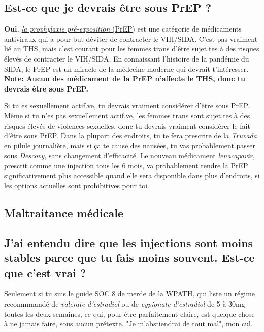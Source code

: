 \documentclass{article}
\begin{document}
\subsection{Est-ce que je devrais être sous PrEP ?}

\textbf{Oui.} \href{https://fr.wikipedia.org/wiki/Prophylaxie_pr%C3%A9-exposition}{\textit{la prophylaxie pré-exposition} (PrEP)} est une catégorie de médicaments antiviraux qui a pour but déviter de contracter le VIH/SIDA. C'est pas vraiment lié au THS, mais c'est courant pour les femmes trans d'être sujet.tes à des risques élevés de contracter le VIH/SIDA. En connaissant l'histoire de la pandémie du SIDA, le PrEP est un miracle de la médecine moderne qui devrait t'intéresser. \textbf{Note: Aucun des médicament de la PrEP n'affecte le THS, donc tu devrais être sous PrEP.}

Si tu es sexuellement actif.ve, tu devrais vraiment considérer d'être sous PrEP. Même si tu n'es pas sexuellement actif.ve, les femmes trans sont sujet.tes à des risques élevés de violences sexuelles, donc tu devrais vraiment considérer le fait d'être sous PrEP. Dans la plupart des endroits, tu te fera prescrire de la \textit{Truvada} en pilule journalière, mais si ça te cause des nausées, tu vas probablement passer sous \textit{Descovy}, sans changement d'efficacité. Le nouveau médicament \textit{lenacapavir}, prescrit comme une injection tous les 6 mois, va probablement rendre la PrEP significativement plus accessible quand elle sera disponible dans plus d'endroits, si les options actuelles sont prohibitives pour toi.

\subsection*{Maltraitance médicale}

\subsection{J'ai entendu dire que les injections sont moins stables parce que tu fais moins souvent. Est-ce que c'est vrai ?}

Seulement si tu suis le guide SOC 8 de merde de la WPATH, qui liste un régime recommmandé de \textit{valerate d'estradiol} ou de \textit{cypionate d'estradiol} de 5 à 30mg toutes les deux semaines, ce qui, pour être parfaitement claire, est quelque chose à ne jamais faire, sous aucun prétexte. "Je m'abstiendrai de tout mal", mon cul.
\end{document}
